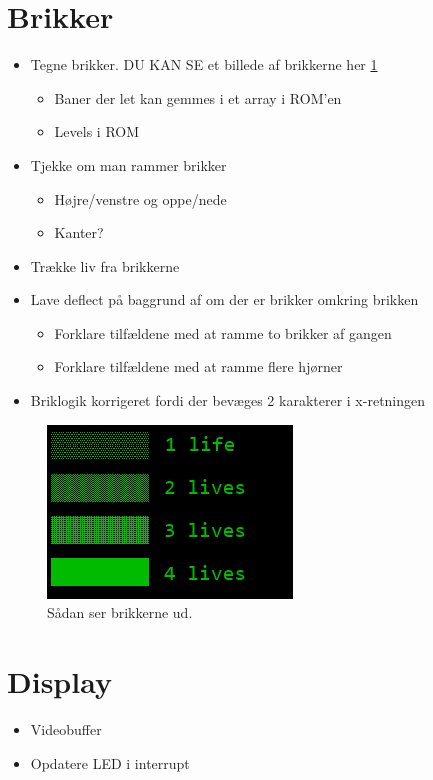 \section{Brikker}
\begin{itemize}
\item Tegne brikker. DU KAN SE et billede af brikkerne her \ref{fig:brik}
\begin{itemize}
\item Baner der let kan gemmes i et array i ROM'en
\item Levels i ROM
\end{itemize}
\item Tjekke om man rammer brikker
\begin{itemize}
\item Højre/venstre og oppe/nede
\item Kanter?
\end{itemize}
\item Trække liv fra brikkerne
\item Lave deflect på baggrund af om der er brikker omkring brikken
\begin{itemize}
\item Forklare tilfældene med at ramme to brikker af gangen
\item Forklare tilfældene med at ramme flere hjørner
\end{itemize}
\item Briklogik korrigeret fordi der bevæges 2 karakterer i x-retningen
\end{itemize}


\begin{figure}[h!]
\centering
\includegraphics[scale=0.5]{figs/brikker.png}
\caption{Sådan ser brikkerne ud.}
\label{fig:brik}
\end{figure}
		

\section{Display}
\begin{itemize}
\item Videobuffer
\item Opdatere LED i interrupt
\end{itemize}

